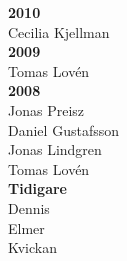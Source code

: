 {\begin{multicols}{2}
\textbf{2010}\\
Cecilia Kjellman\\

\textbf{2009}\\
Tomas Lovén\\

\textbf{2008}\\
Jonas Preisz\\
Daniel Gustafsson\\
Jonas Lindgren\\
Tomas Lovén\\

\textbf{Tidigare}\\
Dennis\\
Elmer\\
Kvickan\\

\end{multicols}
}
